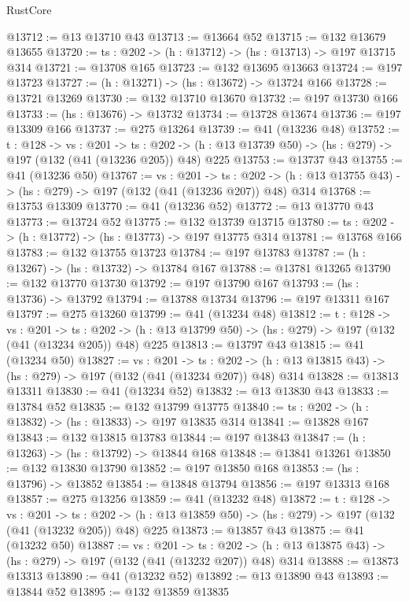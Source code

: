 \begin{lexlean}{RustCore}
\begin{coremodule}
@13712 := @13 @13710 @43
@13713 := @13664 @52
@13715 := @132 @13679 @13655
@13720 := {ts : @202} -> (h : @13712) -> (hs : @13713) -> @197 @13715 @314
@13721 := @13708 @165
@13723 := @132 @13695 @13663
@13724 := @197 @13723
@13727 := (h : @13271) -> (hs : @13672) -> @13724 @166
@13728 := @13721 @13269
@13730 := @132 @13710 @13670
@13732 := @197 @13730 @166
@13733 := (hs : @13676) -> @13732
@13734 := @13728 @13674
@13736 := @197 @13309 @166
@13737 := @275 @13264
@13739 := @41 (@13236 @48)
@13752 := {t : @128} ->
  {vs : @201} ->
  {ts : @202} -> (h : @13 @13739 @50) -> (hs : @279) -> @197 (@132 (@41 (@13236 @205)) @48) @225
@13753 := @13737 @43
@13755 := @41 (@13236 @50)
@13767 := {vs : @201} ->
  {ts : @202} -> (h : @13 @13755 @43) -> (hs : @279) -> @197 (@132 (@41 (@13236 @207)) @48) @314
@13768 := @13753 @13309
@13770 := @41 (@13236 @52)
@13772 := @13 @13770 @43
@13773 := @13724 @52
@13775 := @132 @13739 @13715
@13780 := {ts : @202} -> (h : @13772) -> (hs : @13773) -> @197 @13775 @314
@13781 := @13768 @166
@13783 := @132 @13755 @13723
@13784 := @197 @13783
@13787 := (h : @13267) -> (hs : @13732) -> @13784 @167
@13788 := @13781 @13265
@13790 := @132 @13770 @13730
@13792 := @197 @13790 @167
@13793 := (hs : @13736) -> @13792
@13794 := @13788 @13734
@13796 := @197 @13311 @167
@13797 := @275 @13260
@13799 := @41 (@13234 @48)
@13812 := {t : @128} ->
  {vs : @201} ->
  {ts : @202} -> (h : @13 @13799 @50) -> (hs : @279) -> @197 (@132 (@41 (@13234 @205)) @48) @225
@13813 := @13797 @43
@13815 := @41 (@13234 @50)
@13827 := {vs : @201} ->
  {ts : @202} -> (h : @13 @13815 @43) -> (hs : @279) -> @197 (@132 (@41 (@13234 @207)) @48) @314
@13828 := @13813 @13311
@13830 := @41 (@13234 @52)
@13832 := @13 @13830 @43
@13833 := @13784 @52
@13835 := @132 @13799 @13775
@13840 := {ts : @202} -> (h : @13832) -> (hs : @13833) -> @197 @13835 @314
@13841 := @13828 @167
@13843 := @132 @13815 @13783
@13844 := @197 @13843
@13847 := (h : @13263) -> (hs : @13792) -> @13844 @168
@13848 := @13841 @13261
@13850 := @132 @13830 @13790
@13852 := @197 @13850 @168
@13853 := (hs : @13796) -> @13852
@13854 := @13848 @13794
@13856 := @197 @13313 @168
@13857 := @275 @13256
@13859 := @41 (@13232 @48)
@13872 := {t : @128} ->
  {vs : @201} ->
  {ts : @202} -> (h : @13 @13859 @50) -> (hs : @279) -> @197 (@132 (@41 (@13232 @205)) @48) @225
@13873 := @13857 @43
@13875 := @41 (@13232 @50)
@13887 := {vs : @201} ->
  {ts : @202} -> (h : @13 @13875 @43) -> (hs : @279) -> @197 (@132 (@41 (@13232 @207)) @48) @314
@13888 := @13873 @13313
@13890 := @41 (@13232 @52)
@13892 := @13 @13890 @43
@13893 := @13844 @52
@13895 := @132 @13859 @13835

\end{coremodule}
\end{lexlean}
